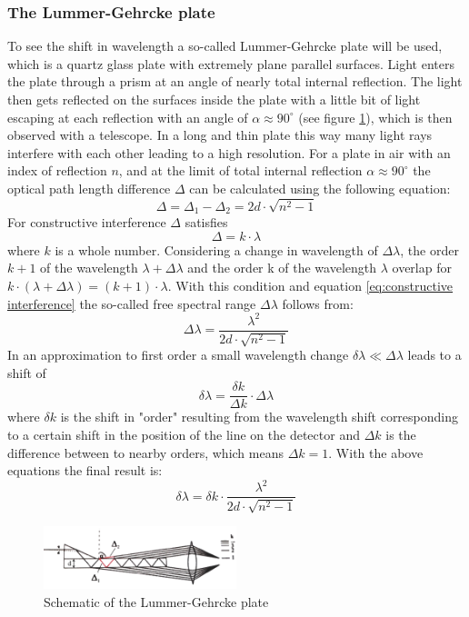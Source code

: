 \documentclass[12pt]{article}
\begin{document}
\subsubsection{The Lummer-Gehrcke plate}
To see the shift in wavelength a so-called Lummer-Gehrcke plate  will be used, which is a quartz glass plate with extremely plane parallel surfaces. Light enters the plate through a prism at an angle of nearly total internal reflection. The light then gets reflected on the surfaces inside the plate with a little bit of light escaping at each reflection with an angle of $\alpha \approx 90^\circ$ (see figure \ref{fig:lummergehrke}), which is then observed with a telescope. In a long and thin plate this way many light rays interfere with each other leading to a high resolution. For a plate in air with an index of reflection $n$, and at the limit of total internal reflection $\alpha\approx 90 ^\circ$ the optical path length difference $\Delta$ can be calculated using the following equation:
\begin{equation}
\Delta=\Delta_1-\Delta_2=2d \cdot \sqrt{n^2-1}
\end{equation}
For constructive interference $\Delta$ satisfies
\begin{equation}
\Delta=k\cdot\lambda 
\label{eq:constructive interference}
\end{equation} 
where $k$ is a whole number. Considering a change in wavelength of $\Delta\lambda$, the order $k+1$ of the wavelength $\lambda+\Delta\lambda$ and the order k of the wavelength $\lambda$ overlap for $k \cdot (\lambda+\Delta\lambda)=(k+1)\cdot\lambda$. With this condition and equation \ref{eq:constructive interference} the so-called free spectral range $\Delta\lambda$ follows from:
\begin{equation}
\Delta\lambda=\frac{\lambda^2}{2d \cdot \sqrt{n^2-1}}
\end{equation}
In an approximation to first order a small wavelength change $\delta\lambda \ll \Delta\lambda$ leads to a shift of 
\begin{equation}
\delta \lambda= \frac{\delta k}{\Delta k} \cdot \Delta\lambda
\end{equation}
where $\delta k$ is the shift in "order" resulting from the wavelength shift corresponding to a certain shift in the position of the line on the detector and $\Delta k$ is the difference between to nearby orders, which means $\Delta k=1$. With the above equations the final result is:
\begin{equation}
\delta\lambda=\delta k \cdot \frac{\lambda^2}{2d\cdot\sqrt{n^2-1}}
\label{dlambda}
\end{equation}
\begin{figure}
\centering
\includegraphics[width=0.5\textwidth]{fig/lummergehrke.png}
\caption{Schematic of the Lummer-Gehrcke plate}
\label{fig:lummergehrke}
\end{figure}
\end{document}
